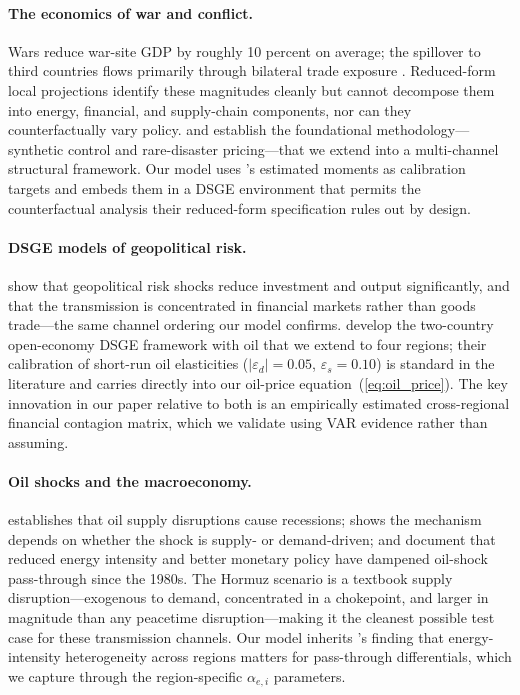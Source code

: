 \documentclass[12pt]{article}
\begin{document}
\paragraph{The economics of war and conflict.} Wars reduce war-site GDP by roughly 10 percent on average; the spillover to third countries flows primarily through bilateral trade exposure \citep{federle2026price}. Reduced-form local projections identify these magnitudes cleanly but cannot decompose them into energy, financial, and supply-chain components, nor can they counterfactually vary policy. \citet{abadie2003economic} and \citet{barro2006rare} establish the foundational methodology---synthetic control and rare-disaster pricing---that we extend into a multi-channel structural framework. Our model uses \citeauthor{federle2026price}'s estimated moments as calibration targets and embeds them in a DSGE environment that permits the counterfactual analysis their reduced-form specification rules out by design.

\paragraph{DSGE models of geopolitical risk.} \citet{caldara2022measuring} show that geopolitical risk shocks reduce investment and output significantly, and that the transmission is concentrated in financial markets rather than goods trade---the same channel ordering our model confirms. \citet{bodenstein2011oil} develop the two-country open-economy DSGE framework with oil that we extend to four regions; their calibration of short-run oil elasticities ($|\varepsilon_d| = 0.05$, $\varepsilon_s = 0.10$) is standard in the literature and carries directly into our oil-price equation~(\ref{eq:oil_price}). The key innovation in our paper relative to both is an empirically estimated cross-regional financial contagion matrix, which we validate using VAR evidence rather than assuming.

\paragraph{Oil shocks and the macroeconomy.} \citet{hamilton1983oil} establishes that oil supply disruptions cause recessions; \citet{kilian2009not} shows the mechanism depends on whether the shock is supply- or demand-driven; and \citet{blanchard2007macroeconomic} document that reduced energy intensity and better monetary policy have dampened oil-shock pass-through since the 1980s. The Hormuz scenario is a textbook supply disruption---exogenous to demand, concentrated in a chokepoint, and larger in magnitude than any peacetime disruption---making it the cleanest possible test case for these transmission channels. Our model inherits \citeauthor{blanchard2007macroeconomic}'s finding that energy-intensity heterogeneity across regions matters for pass-through differentials, which we capture through the region-specific $\alpha_{e,i}$ parameters.
\end{document}
